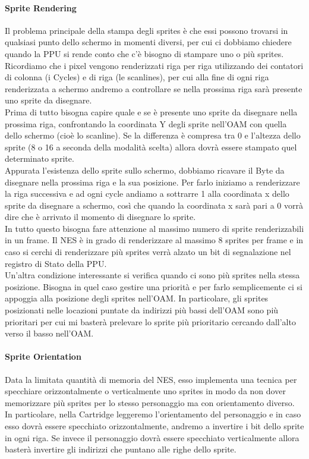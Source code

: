 \documentclass[11pt]{article}
\begin{document}
\paragraph{Sprite Rendering}
Il problema principale della stampa degli sprites è che essi possono trovarsi in qualsiasi punto dello schermo in momenti diversi, per cui ci dobbiamo chiedere quando la PPU si rende conto che c’è bisogno di stampare uno o più sprites. Ricordiamo che i pixel vengono renderizzati riga per riga utilizzando dei contatori di colonna (i Cycles) e di riga (le scanlines), per cui alla fine di ogni riga renderizzata a schermo andremo a controllare se nella prossima riga sarà presente uno sprite da disegnare. \\
Prima di tutto bisogna capire quale e se è presente uno sprite da disegnare nella prossima riga, confrontando la coordinata Y degli sprite nell’OAM con quella dello schermo (cioè lo scanline). Se la differenza è compresa tra 0 e l’altezza dello sprite (8 o 16 a seconda della modalità scelta) allora dovrà essere stampato quel determinato sprite.\\
Appurata l’esistenza dello sprite sullo schermo, dobbiamo ricavare il Byte da disegnare nella prossima riga e la sua posizione. Per farlo iniziamo a renderizzare la riga successiva e ad ogni cycle andiamo a sottrarre 1 alla coordinata x dello sprite da disegnare a schermo, così che quando la coordinata x sarà pari a 0 vorrà dire che è arrivato il momento di disegnare lo sprite.  \\
In tutto questo bisogna fare attenzione al massimo numero di sprite renderizzabili in un frame. Il NES è in grado di renderizzare al massimo 8 sprites per frame e in caso si cerchi di renderizzare più sprites verrà alzato un bit di segnalazione nel registro di Stato della PPU.\\
Un'altra condizione interessante si verifica quando ci sono più sprites nella stessa posizione. Bisogna in quel caso gestire una priorità e per farlo semplicemente ci si appoggia alla posizione degli sprites nell’OAM. In particolare, gli sprites posizionati nelle locazioni puntate da indirizzi più bassi dell’OAM sono più prioritari per cui mi basterà prelevare lo sprite più prioritario cercando dall’alto verso il basso nell’OAM.
\paragraph{Sprite Orientation}
Data la limitata quantità di memoria del NES, esso implementa una tecnica per specchiare orizzontalmente o verticalmente uno sprites in modo da non dover memorizzare più sprites per lo stesso personaggio ma con orientamento diverso. In particolare, nella Cartridge leggeremo l’orientamento del personaggio e in caso esso dovrà essere specchiato orizzontalmente, andremo a invertire i bit dello sprite in ogni riga. Se invece il personaggio dovrà essere specchiato verticalmente allora basterà invertire gli indirizzi che puntano alle righe dello sprite. 
\end{document}
